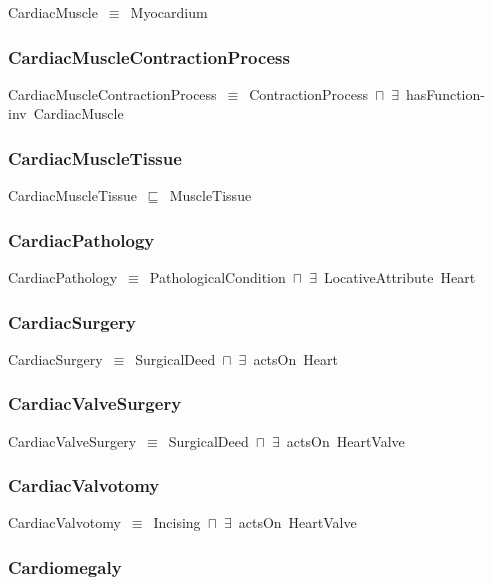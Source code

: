 \documentclass{article}
\begin{document}
CardiacMuscle~\ensuremath{\equiv}~Myocardium

\subsubsection*{CardiacMuscleContractionProcess}

CardiacMuscleContractionProcess~\ensuremath{\equiv}~ContractionProcess~\ensuremath{\sqcap}~\ensuremath{\exists}~hasFunction-inv~CardiacMuscle

\subsubsection*{CardiacMuscleTissue}

CardiacMuscleTissue~\ensuremath{\sqsubseteq}~MuscleTissue~

\subsubsection*{CardiacPathology}

CardiacPathology~\ensuremath{\equiv}~PathologicalCondition~\ensuremath{\sqcap}~\ensuremath{\exists}~LocativeAttribute~Heart

\subsubsection*{CardiacSurgery}

CardiacSurgery~\ensuremath{\equiv}~SurgicalDeed~\ensuremath{\sqcap}~\ensuremath{\exists}~actsOn~Heart

\subsubsection*{CardiacValveSurgery}

CardiacValveSurgery~\ensuremath{\equiv}~SurgicalDeed~\ensuremath{\sqcap}~\ensuremath{\exists}~actsOn~HeartValve

\subsubsection*{CardiacValvotomy}

CardiacValvotomy~\ensuremath{\equiv}~Incising~\ensuremath{\sqcap}~\ensuremath{\exists}~actsOn~HeartValve

\subsubsection*{Cardiomegaly}
\end{document}
